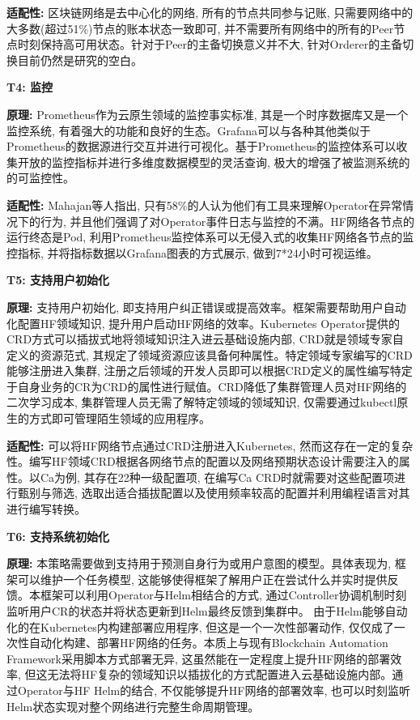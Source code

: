 \textbf{适配性: }区块链网络是去中心化的网络, 所有的节点共同参与记账, 只需要网络中的大多数(超过51\%)节点的账本状态一致即可, 并不需要所有网络中的所有的Peer节点时刻保持高可用状态。针对于Peer的主备切换意义并不大, 针对Orderer的主备切换目前仍然是研究的空白。

\textbf{T4: 监控}

\textbf{原理: }Prometheus\cite{sukhija2019towards}作为云原生领域的监控事实标准, 其是一个时序数据库又是一个监控系统, 有着强大的功能和良好的生态。Grafana可以与各种其他类似于Prometheus的数据源进行交互并进行可视化。基于Prometheus的监控体系可以收集开放的监控指标并进行多维度数据模型的灵活查询, 极大的增强了被监测系统的的可监控性。

\textbf{适配性: } Mahajan等人\cite{mahajan2020suture}指出, 只有58\%的人认为他们有工具来理解Operator在异常情况下的行为, 并且他们强调了对Operator事件日志与监控的不满。HF网络各节点的运行终态是Pod, 利用Prometheus监控体系可以无侵入式的收集HF网络各节点的监控指标, 并将指标数据以Grafana图表的方式展示, 做到7*24小时可视运维。


\textbf{T5: 支持用户初始化}

\textbf{原理: }支持用户初始化, 即支持用户纠正错误或提高效率。框架需要帮助用户自动化配置HF领域知识, 提升用户启动HF网络的效率。Kubernetes Operator提供的CRD方式可以插拔式地将领域知识注入进云基础设施内部, CRD就是领域专家自定义的资源范式, 其规定了领域资源应该具备何种属性。特定领域专家编写的CRD能够注册进入集群, 注册之后领域的开发人员即可以根据CRD定义的属性编写特定于自身业务的CR为CRD的属性进行赋值。CRD降低了集群管理人员对HF网络的二次学习成本, 集群管理人员无需了解特定领域的领域知识, 仅需要通过kubectl原生的方式即可管理陌生领域的应用程序。

\textbf{适配性: }可以将HF网络节点通过CRD注册进入Kubernetes, 然而这存在一定的复杂性。编写HF领域CRD根据各网络节点的配置\footnotemark[1]\footnotemark[2]\footnotemark[3]以及网络预期状态设计需要注入的属性。以Ca为例, 其存在22种一级配置项, 在编写Ca CRD时就需要对这些配置项进行甄别与筛选, 选取出适合插拔配置以及使用频率较高的配置并利用编程语言对其进行编写转换。

\textbf{T6: 支持系统初始化}

\textbf{原理: }本策略需要做到支持用于预测自身行为或用户意图的模型。具体表现为, 框架可以维护一个任务模型, 这能够使得框架了解用户正在尝试什么并实时提供反馈。本框架可以利用Operator与Helm相结合的方式, 通过Controller协调机制时刻监听用户CR的状态并将状态更新到Helm最终反馈到集群中。
由于Helm能够自动化的在Kubernetes内构建部署应用程序, 但这是一个一次性部署动作, 仅仅成了一次性自动化构建、部署HF网络的任务。本质上与现有Blockchain Automation Framework采用脚本方式部署无异, 这虽然能在一定程度上提升HF网络的部署效率, 但这无法将HF复杂的领域知识以插拔化的方式配置进入云基础设施内部。通过Operator与HF Helm的结合, 不仅能够提升HF网络的部署效率, 也可以时刻监听Helm状态实现对整个网络进行完整生命周期管理。

